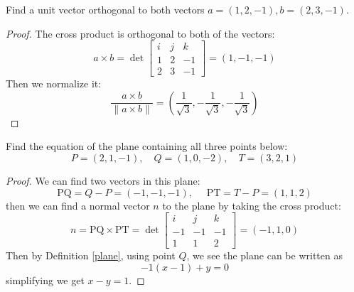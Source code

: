 \documentclass[openany]{book}
\begin{document}
\begin{prob}
    Find a unit vector orthogonal to both vectors $a=(1,2,-1), b=(2,3,-1)$.
\end{prob}
\begin{proof}
    The cross product is orthogonal to both of the vectors:
    \begin{equation*}
        a\times b=\det\begin{bmatrix}
            i&j&k\\
            1&2&-1\\
            2&3&-1
        \end{bmatrix}=(1,-1, -1)
    \end{equation*}
    Then we normalize it:
    \begin{equation*}
        \frac{a\times b}{\|a\times b\|}=\left(\frac{1}{\sqrt{3}}, -\frac{1}{\sqrt{3}}, -\frac{1}{\sqrt{3}}\right)
    \end{equation*}
\end{proof}


\begin{prob}
    Find the equation of the plane containing all three points below:
    \begin{equation*}
        P=(2,1,-1), \quad Q=(1,0,-2), \quad T=(3,2,1)
    \end{equation*}
\end{prob}
\begin{proof}
    We can find two vectors in this plane:
    \begin{equation*}
        \text{PQ}=Q-P=(-1,-1,-1), \quad \text{ PT}=T-P=(1,1,2)
    \end{equation*}
    then we can find a normal vector $n$ to the plane by taking the cross product:
    \begin{equation*}
        n=\text{PQ}\times\text{PT}=\det\begin{bmatrix}
            i&j&k\\
            -1&-1&-1\\
            1&1&2
        \end{bmatrix}=(-1,1,0)
    \end{equation*}
    Then by Definition \ref{plane}, using point $Q$, we see the plane can be written as 
    \begin{equation*}
        -1(x-1)+y=0
    \end{equation*}
    simplifying we get $x-y=1$.
\end{proof}
\end{document}
